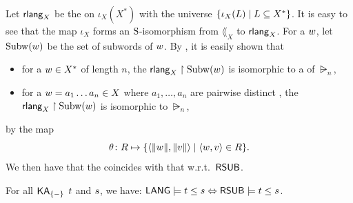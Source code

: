 Let $\mathsf{rlang}_{X}$ be the  on $\iota_{X}(X^*)$ with the universe $\{\iota_{X}(L) \mid L \subseteq X^*\}$.
It is easy to see that the map $\iota_{X}$ forms an $\mathrm{S}$-isomorphism from $\lang_{X}$ to $\mathsf{rlang}_{X}$.
For a  $\word$, let $\Subw(\word)$ be the set of subwords of $\word$.
By , it is easily shown that
\begin{itemize}
    \item for a  $\word \in X^*$ of length $n$,
    the  $\rlang_{X} \restriction \Subw(\word)$ is isomorphic to a  of $\rsub_n$,
    \item for a  $\word = a_1 \dots a_n \in X$ where $a_1, \dots, a_n$ are pairwise distinct ,
    the  $\rlang_{X} \restriction \Subw(\word)$ is isomorphic to $\rsub_n$,
\end{itemize}
by the map
\[\theta \colon R \mapsto \set{\tuple{\len{\word}, \len{\word[2]}} \mid \tuple{\word, \word[2]} \in R}.\]
We then have that the  coincides with that w.r.t.\ $\mathsf{RSUB}$.
\begin{theorem}\label{theorem: LANG and ORD}
    For all $\mathsf{KA}_{\{-\}}$  $\term[1]$ and $\term[2]$,
    we have: $\LANG \models \term[1] \le \term[2] \Leftrightarrow \RSUB \models \term[1] \le \term[2]$.
\end{theorem}
